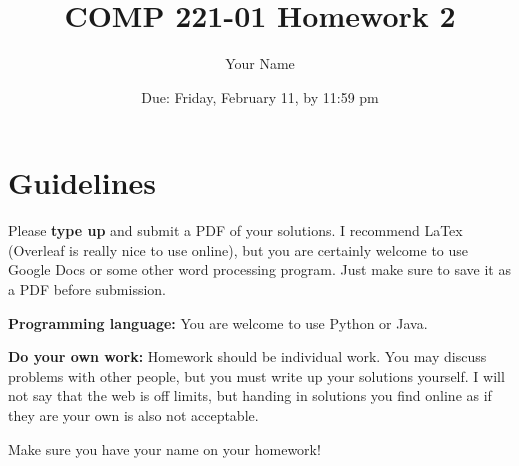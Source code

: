\documentclass{article}
\title{COMP 221-01 Homework 2}
\author{Your Name}
\date{Due: Friday, February 11, by 11:59 pm}
\begin{document}
\maketitle


\section{Guidelines} 
Please \textbf{type up }and submit a PDF of your solutions.  I recommend LaTex (Overleaf is really nice to use online), but you are certainly welcome to use Google Docs or some other word processing program.  Just make sure to save it as a PDF before submission.  

\textbf{Programming language:} You are welcome to use Python or Java.  

\textbf{Do your own work:} Homework should be individual work.  You may discuss problems with other people, but you must write up your solutions yourself.  I will not say that the web is off limits, but handing in solutions you find online as if they are your own is also not acceptable.

Make sure you have your name on your homework!  
\end{document}
